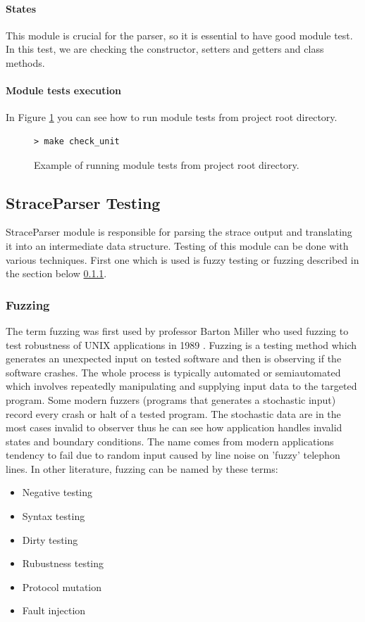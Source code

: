 \paragraph{States}
This module is crucial for the parser, so it is essential to have good module
test. In this test, we are checking the constructor, setters and getters and
class methods.

\paragraph{Module tests execution}
In Figure \ref{exec/unit_tests} you can see how to run module tests from project
root directory.

\begin{figure}[h]
	\lstset{style=npl}
\begin{lstlisting}
> make check_unit
\end{lstlisting}
	\caption{Example of running module tests from project root directory.}
	\label{exec/unit_tests}
\end{figure}

\subsection{StraceParser Testing}
StraceParser module is responsible for parsing the strace output and translating
it into an intermediate data structure. Testing of this module can be done with
various techniques. First one which is used is fuzzy testing or fuzzing
described in the section below \ref{fuzzing}.

\subsubsection{Fuzzing}
\label{fuzzing}
The term fuzzing was first used by professor Barton Miller who used fuzzing to
test robustness of UNIX applications in 1989 \cite{Takanen:2008:FSS:1404500,
Marhefka2013}. Fuzzing is a testing method which generates an unexpected input
on tested software and then is observing if the software crashes. The whole
process is typically automated or semiautomated which involves repeatedly
manipulating and supplying input data to the targeted program. Some modern
fuzzers (programs that generates a stochastic input) record every crash or halt
of a tested program. The stochastic data are in the most cases invalid to
observer thus he can see how application handles invalid states and boundary
conditions. The name comes from modern applications tendency to fail due to
random input caused by line noise on 'fuzzy' telephon
lines.\cite{Takanen:2008:FSS:1404500, N2LYDLnqzEFYp0wM, takanen2009fuzzing} In
other literature, fuzzing can be named by these terms:
\begin{itemize}
	\item Negative testing
	\item Syntax testing
	\item Dirty testing
	\item Rubustness testing
	\item Protocol mutation
	\item Fault injection
\end{itemize}

